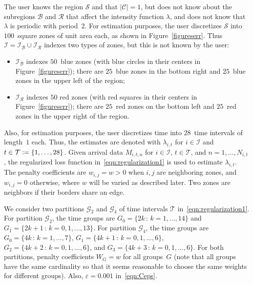 \documentclass[article]{jss}
\def\defi{\vcentcolon=}
\begin{document}
The user knows the region $\mathcal{S}$ and that $|\mathcal{C}| = 1$, but does not know about the subregions $\mathcal{B}$ and $\mathcal{R}$ that affect the intensity function $\lambda$, and does not know that $\lambda$ is periodic with period~$2$.
For estimation purposes, the user discretizes $\mathcal{S}$ into $100$~square zones of unit area each, as shown in Figure~\ref{figureserr}.
Thus $\mathcal{I} = \mathcal{I}_{\mathcal{B}} \cup \mathcal{I}_{\mathcal{R}}$ indexes two types of zones, but this is not known by the user:
\begin{itemize}
\item
$\mathcal{I}_{\mathcal{B}}$ indexes $50$~blue zones (with blue circles in their centers in Figure~\ref{figureserr}); there are $25$~blue zones in the bottom right and $25$~blue zones in the upper left of the region;
\item
$\mathcal{I}_{\mathcal{R}}$ indexes $50$ red zones (with red squares in their centers in Figure~\ref{figureserr}); there are $25$~red zones on the bottom left and $25$~red zones in the upper right of the region.
\end{itemize}
Also, for estimation purposes, the user discretizes time into $28$~time intervals of length~$1$ each.
Thus, the estimates are denoted with $\lambda_{i,t}$ for $i \in \mathcal{I}$ and $t \in \mathcal{T} \defi \{1,\ldots,28\}$.
Given arrival data $M_{i,t,n}$ for $i \in \mathcal{I}$, $t \in \mathcal{T}$, and $n = 1,\ldots,N_{i,t}$, the regularized loss function in~\eqref{eqn:regularization1} is used to estimate $\lambda_{i,t}$.
The penalty coefficients are $w_{i,j} = w > 0$ when $i,j$ are neighboring zones, and $w_{i,j} = 0$ otherwise, where $w$ will be varied as described later. Two zones are neighbors if their borders share an edge.

We consider two partitions $\mathcal{G}_{2}$ and $\mathcal{G}_{4}$ of time intervals $\mathcal{T}$ in~\eqref{eqn:regularization1}.
For partition $\mathcal{G}_{2}$, the time groups are $G_{0} = \{2k \, : \, k=1,\ldots,14\}$ and $G_{1} = \{2k+1 \, : \, k=0,1,\ldots,13\}$.
For partition $\mathcal{G}_{4}$, the time groups are $G_{0} = \{4k \, : \, k=1,\ldots,7\}$, $G_{1} = \{4k+1 \, : \, k=0,1,\ldots,6\}$, $G_{2} = \{4k+2 \, : \, k=0,1,\ldots,6\}$, and $G_{3} = \{4k+3 \, : \, k=0,1,\ldots,6\}$.
For both partitions, penalty coefficients $W_{G} = w$ for all groups~$G$ (note that all groups have the same cardinality so that it seems reasonable to choose the same weights for different groups).
Also, $\varepsilon = 0.001$ in~\eqref{eqn:Ceps}.
\end{document}
